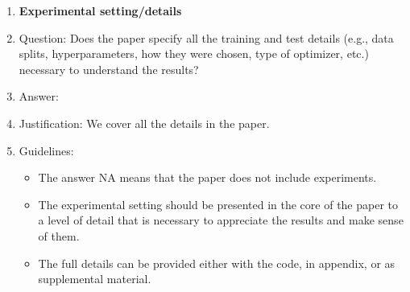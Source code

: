 \documentclass{article}
\begin{document}
\begin{enumerate}
\item {\bf Experimental setting/details}
    \item[] Question: Does the paper specify all the training and test details (e.g., data splits, hyperparameters, how they were chosen, type of optimizer, etc.) necessary to understand the results?
    \item[] Answer: \answerYes{} %
    \item[] Justification: We cover all the details in the paper.
    \item[] Guidelines:
    \begin{itemize}
        \item The answer NA means that the paper does not include experiments.
        \item The experimental setting should be presented in the core of the paper to a level of detail that is necessary to appreciate the results and make sense of them.
        \item The full details can be provided either with the code, in appendix, or as supplemental material.
    \end{itemize}


\end{enumerate}
\end{document}
